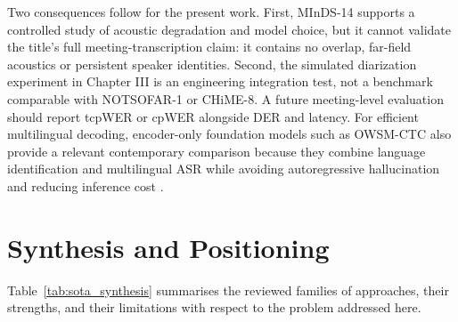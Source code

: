 \documentclass[12pt]{report}
\begin{document}
Two consequences follow for the present work. First, MInDS-14 supports a controlled study of acoustic degradation and model choice, but it cannot validate the title's full meeting-transcription claim: it contains no overlap, far-field acoustics or persistent speaker identities. Second, the simulated diarization experiment in Chapter III is an engineering integration test, not a benchmark comparable with NOTSOFAR-1 or CHiME-8. A future meeting-level evaluation should report tcpWER or cpWER alongside DER and latency. For efficient multilingual decoding, encoder-only foundation models such as OWSM-CTC also provide a relevant contemporary comparison because they combine language identification and multilingual ASR while avoiding autoregressive hallucination and reducing inference cost \cite{peng2024owsmctc}.
\section{Synthesis and Positioning}
Table~\ref{tab:sota_synthesis} summarises the reviewed families of approaches, their strengths, and their limitations with respect to the problem addressed here.
\end{document}
